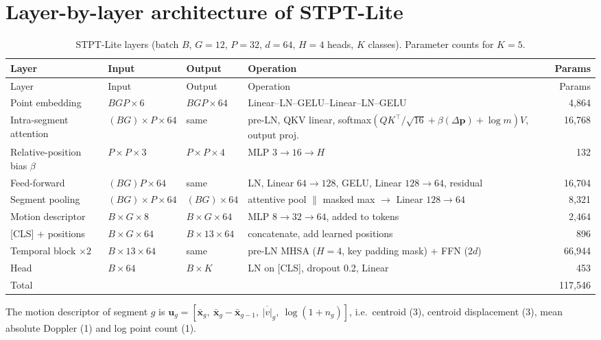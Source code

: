 \section{Layer-by-layer architecture of STPT-Lite}
\begin{longtable}{L{3.6cm}L{3.0cm}L{3.0cm}L{4.6cm}r}
\caption{STPT-Lite layers (batch $B$, $G=12$, $P=32$, $d=64$, $H=4$ heads, $K$ classes). Parameter counts for $K=5$.}\label{tab:layers}\\
\toprule
Layer & Input & Output & Operation & Params \\
\midrule\endfirsthead
\toprule Layer & Input & Output & Operation & Params \\ \midrule\endhead
Point embedding & $B G P\times6$ & $BGP\times64$ & Linear--LN--GELU--Linear--LN--GELU & 4{,}864 \\
Intra-segment attention & $(BG)\times P\times64$ & same & pre-LN, QKV linear, softmax$(QK^\top/\sqrt{16}+\beta(\Delta\mathbf{p})+\log m)V$, output proj. & 16{,}768 \\
Relative-position bias $\beta$ & $P\times P\times3$ & $P\times P\times4$ & MLP $3\!\to\!16\!\to\!H$ & 132 \\
Feed-forward & $(BG)P\times64$ & same & LN, Linear $64\!\to\!128$, GELU, Linear $128\!\to\!64$, residual & 16{,}704 \\
Segment pooling & $(BG)\times P\times64$ & $(BG)\times64$ & attentive pool $\|$ masked max $\to$ Linear $128\!\to\!64$ & 8{,}321 \\
Motion descriptor & $B\times G\times8$ & $B\times G\times64$ & MLP $8\!\to\!32\!\to\!64$, added to tokens & 2{,}464 \\
{[CLS]} + positions & $B\times G\times64$ & $B\times13\times64$ & concatenate, add learned positions & 896 \\
Temporal block $\times2$ & $B\times13\times64$ & same & pre-LN MHSA ($H=4$, key padding mask) + FFN ($2d$) & 66{,}944 \\
Head & $B\times64$ & $B\times K$ & LN on [CLS], dropout 0.2, Linear & 453 \\
\midrule
Total & & & & 117{,}546 \\
\bottomrule
\end{longtable}

The motion descriptor of segment $g$ is
$\mathbf{u}_g=[\bar{\mathbf{x}}_g,\ \bar{\mathbf{x}}_g-\bar{\mathbf{x}}_{g-1},\ \overline{|v|}_g,\ \log(1+n_g)]$,
i.e.\ centroid (3), centroid displacement (3), mean absolute Doppler (1) and log
point count (1).

